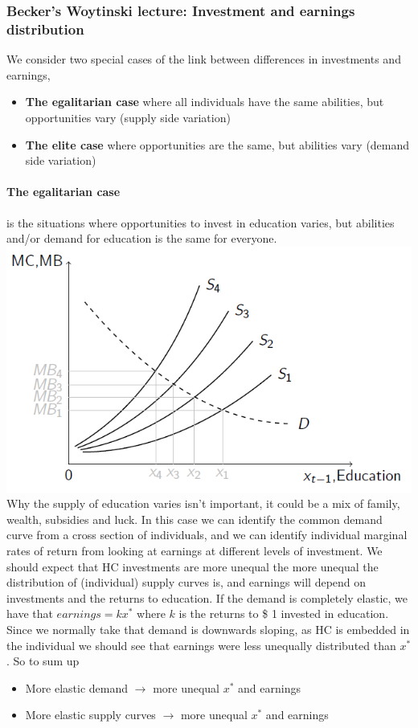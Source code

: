\documentclass[12pt, a4paper]{article}
\begin{document}
\begin{multicols}{2}
\subsubsection{Becker's Woytinski lecture: Investment and earnings distribution}
We consider two special cases of the link between differences in investments and earnings, 
\begin{itemize}
\item \textbf{The egalitarian case} where all individuals have the same abilities, but opportunities vary (supply side variation)
\item \textbf{The elite case} where opportunities are the same, but abilities vary (demand side variation)
\end{itemize}
\paragraph{The egalitarian case} is the situations where opportunities to invest in education varies, but abilities and/or demand for education is the same for everyone.
\includegraphics[width = 0.45 \textwidth]{egal.PNG}
Why the supply of education varies isn't important, it could be a mix of family, wealth, subsidies and luck.  In this case we can identify the common demand curve from a cross section of individuals, and we can identify individual marginal rates of return from looking at earnings at different levels of investment. We should expect that HC investments are more unequal the more unequal the distribution of (individual) supply curves is, and earnings will depend on investments and the returns to education. If the demand is completely elastic, we have that $earnings = k x^*$ where $k$ is the returns to \$ 1 invested in education. Since we normally take that demand is downwards sloping, as HC is embedded in the individual we should see that earnings were less unequally distributed than $x^*$. So to sum up
\begin{itemize}
\item More elastic demand $\rightarrow$ more unequal $x^*$ and earnings
\item More elastic supply curves $\rightarrow$ more unequal $x^*$ and earnings
\end{itemize}


\end{multicols}
\end{document}
